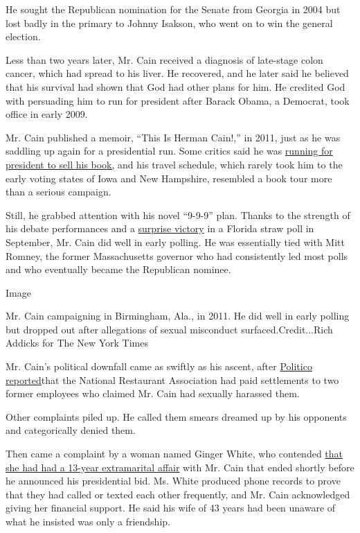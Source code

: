 He sought the Republican nomination for the Senate from Georgia in 2004
but lost badly in the primary to Johnny Isakson, who went on to win the
general election.

Less than two years later, Mr. Cain received a diagnosis of late-stage
colon cancer, which had spread to his liver. He recovered, and he later
said he believed that his survival had shown that God had other plans
for him. He credited God with persuading him to run for president after
Barack Obama, a Democrat, took office in early 2009.

Mr. Cain published a memoir, ``This Is Herman Cain!,'' in 2011, just as
he was saddling up again for a presidential run. Some critics said he
was
\href{https://www.theatlantic.com/politics/archive/2011/10/herman-cain-skips-out-on-early-states-to-push-his-new-book/246260/}{running
for president to sell his book,} and his travel schedule, which rarely
took him to the early voting states of Iowa and New Hampshire, resembled
a book tour more than a serious campaign.

Still, he grabbed attention with his novel ``9-9-9'' plan. Thanks to the
strength of his debate performances and a
\href{http://thecaucus.blogs.nytimes3xbfgragh.onion/2011/09/24/herman-cain-wins-florida-straw-poll/}{surprise
victory} in a Florida straw poll in September, Mr. Cain did well in
early polling. He was essentially tied with Mitt Romney, the former
Massachusetts governor who had consistently led most polls and who
eventually became the Republican nominee.

Image

Mr. Cain campaigning in Birmingham, Ala., in 2011. He did well in early
polling but dropped out after allegations of sexual misconduct
surfaced.Credit...Rich Addicks for The New York Times

Mr. Cain's political downfall came as swiftly as his ascent, after
\href{https://www.politico.com/story/2011/10/exclusive-2-women-accused-cain-of-inappropriate-behavior-067194}{Politico
reported}that the National Restaurant Association had paid settlements
to two former employees who claimed Mr. Cain had sexually harassed them.

Other complaints piled up. He called them smears dreamed up by his
opponents and categorically denied them.

Then came a complaint by a woman named Ginger White, who contended
\href{https://www.nytimes3xbfgragh.onion/2011/11/29/us/politics/cain-accused-of-affair-by-ginger-white.html}{that
she had had a 13-year extramarital affair} with Mr. Cain that ended
shortly before he announced his presidential bid. Ms. White produced
phone records to prove that they had called or texted each other
frequently, and Mr. Cain acknowledged giving her financial support. He
said his wife of 43 years had been unaware of what he insisted was only
a friendship.

